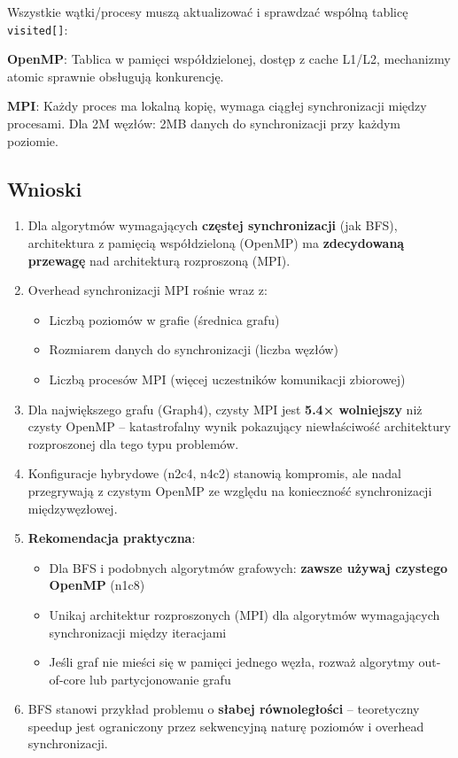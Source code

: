 Wszystkie wątki/procesy muszą aktualizować i sprawdzać wspólną tablicę \texttt{visited[]}:

\textbf{OpenMP}: Tablica w pamięci współdzielonej, dostęp z cache L1/L2, mechanizmy atomic sprawnie obsługują konkurencję.

\textbf{MPI}: Każdy proces ma lokalną kopię, wymaga ciągłej synchronizacji między procesami. Dla 2M węzłów: 2MB danych do synchronizacji przy każdym poziomie.

\subsection{Wnioski}

\begin{enumerate}
    \item Dla algorytmów wymagających \textbf{częstej synchronizacji} (jak BFS), architektura z pamięcią współdzieloną (OpenMP) ma \textbf{zdecydowaną przewagę} nad architekturą rozproszoną (MPI).
    
    \item Overhead synchronizacji MPI rośnie wraz z:
    \begin{itemize}
        \item Liczbą poziomów w grafie (średnica grafu)
        \item Rozmiarem danych do synchronizacji (liczba węzłów)
        \item Liczbą procesów MPI (więcej uczestników komunikacji zbiorowej)
    \end{itemize}
    
    \item Dla największego grafu (Graph4), czysty MPI jest \textbf{5.4× wolniejszy} niż czysty OpenMP -- katastrofalny wynik pokazujący niewłaściwość architektury rozproszonej dla tego typu problemów.
    
    \item Konfiguracje hybrydowe (n2c4, n4c2) stanowią kompromis, ale nadal przegrywają z czystym OpenMP ze względu na konieczność synchronizacji międzywęzłowej.
    
    \item \textbf{Rekomendacja praktyczna}:
    \begin{itemize}
        \item Dla BFS i podobnych algorytmów grafowych: \textbf{zawsze używaj czystego OpenMP} (n1c8)
        \item Unikaj architektur rozproszonych (MPI) dla algorytmów wymagających synchronizacji między iteracjami
        \item Jeśli graf nie mieści się w pamięci jednego węzła, rozważ algorytmy out-of-core lub partycjonowanie grafu
    \end{itemize}
    
    \item BFS stanowi przykład problemu o \textbf{słabej równoległości} -- teoretyczny speedup jest ograniczony przez sekwencyjną naturę poziomów i overhead synchronizacji.
\end{enumerate}
